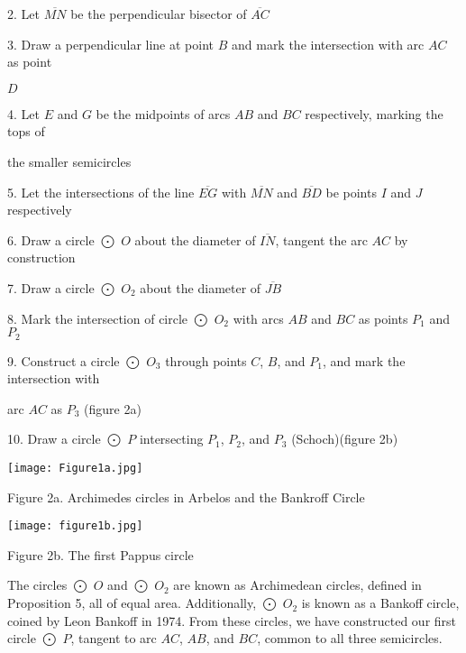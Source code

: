 \documentclass[12pt]{article}
\begin{document}
2. Let $\overline{MN}$ be the perpendicular bisector of $\overline{AC}$

3. Draw a perpendicular line at point $B$ and mark the intersection with arc $AC$ as point 

\hspace{15}$D$

4. Let $E$ and $G$ be the midpoints of arcs $AB$ and $BC$ respectively, marking the tops of 

\hspace{15}the smaller semicircles 

5. Let the intersections of the line $\overline{EG}$ with $\overline{MN}$ and $\overline{BD}$ be points $I$ and $J$ respectively

6. Draw a circle $\bigodot$ $O$ about the diameter of $\overline{IN}$, tangent the arc $AC$ by construction

7. Draw a circle $\bigodot$ $O_2$ about the diameter of $\overline{JB}$

8. Mark the intersection of circle $\bigodot$ $O_2$ with arcs $AB$ and $BC$ as points $P_1$ and $P_2$

9. Construct a circle $\bigodot$ $O_3$ through points $C$, $B$, and $P_1$, and mark the intersection with 

\hspace{15}arc $AC$ as $P_3$ (figure 2a)

10. Draw a circle $\bigodot$ $P$ intersecting $P_1$, $P_2$, and $P_3$ (Schoch)(figure 2b)
\begin{center}
\texttt{[image: Figure1a.jpg]}

Figure 2a. Archimedes circles in Arbelos and the Bankroff Circle
\end{center}

\begin{center}
\texttt{[image: figure1b.jpg]}

Figure 2b. The first Pappus circle
\end{center}

The circles $\bigodot$ $O$ and $\bigodot$ $O_2$ are known as Archimedean circles, defined in Proposition 5, all of equal area. Additionally, $\bigodot$ $O_2$ is known as a Bankoff circle, coined by Leon Bankoff in 1974. From these circles, we have constructed our first circle $\bigodot$ $P$, tangent to arc $AC$, $AB$, and $BC$, common to all three semicircles.
\end{document}
